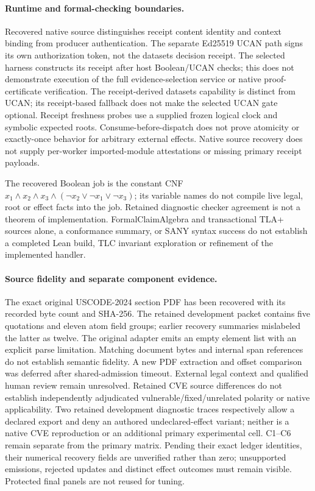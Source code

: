 \paragraph{Runtime and formal-checking boundaries.}
Recovered native source distinguishes receipt content identity and context
binding from producer authentication. The separate Ed25519 UCAN path signs its
own authorization token, not the datasets decision receipt. The selected harness
constructs its receipt after host Boolean/UCAN checks; this does not demonstrate
execution of the full evidence-selection service or native proof-certificate
verification. The receipt-derived datasets capability is distinct from UCAN;
its receipt-based fallback does not make the selected UCAN gate optional.
Receipt freshness probes use a supplied frozen logical clock and symbolic
expected roots. Consume-before-dispatch does not prove atomicity or exactly-once
behavior for arbitrary external effects. Native source recovery does not supply
per-worker imported-module attestations or missing primary receipt payloads.

The recovered Boolean job is the constant CNF
$x_1\land x_2\land x_3\land(\neg x_2\lor\neg x_1\lor\neg x_3)$;
its variable names do not compile live legal, root or effect facts into the job.
Retained diagnostic checker agreement is not a theorem of implementation.
FormalClaimAlgebra and transactional TLA+ sources alone, a conformance summary,
or SANY syntax success do not establish a completed Lean build, TLC invariant
exploration or refinement of the implemented handler.

\paragraph{Source fidelity and separate component evidence.}
The exact original USCODE-2024 section PDF has been recovered with its recorded
byte count and SHA-256. The retained development packet contains five quotations
and eleven atom field groups; earlier recovery summaries mislabeled the latter
as twelve. The original adapter emits an empty element list with an explicit
parse limitation. Matching document bytes and internal span references do not
establish semantic fidelity. A new PDF extraction and offset comparison was
deferred after shared-admission timeout. External legal context and qualified
human review remain unresolved. Retained CVE source differences do not
establish independently adjudicated vulnerable/fixed/unrelated polarity or
native applicability. Two retained development diagnostic traces respectively
allow a declared export and deny an authored undeclared-effect variant; neither
is a native CVE reproduction or an additional primary experimental cell.
C1--C6 remain separate from the primary matrix. Pending their exact ledger
identities, their numerical recovery fields are unverified rather than zero;
unsupported emissions, rejected updates and distinct effect outcomes must
remain visible. Protected final panels are not reused for tuning.
